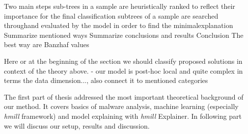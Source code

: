 
Two main steps
    sub-trees in a sample are heuristically ranked to reflect their importance for the final classification
    subtrees of a sample are searched throughand evaluated by the model in order to find the minimalexplanation
Summarize mentioned ways
Summarize conclusions and results
    Conclusion The best way are Banzhaf values

Here or at the beginning of the section we should classify proposed solutions in context of the theory above. - our model is post-hoc local and quite complex in terms the data dimension..., also connect it to mentioned categories



The first part of thesis addressed the most important theoretical background of our method. It covers basics of malware analysis, machine learning (especially \emph{hmill} framework) and model explaining with \emph{hmill} Explainer. In following part we will discuss our setup, results and discussion.




